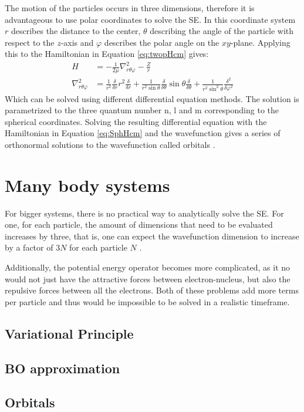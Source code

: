\documentclass[../master_thesis.tex]{subfiles}
\begin{document}
The motion of the particles occurs in three dimensions, therefore it is
advantageous to use polar coordinates to solve the \ac{SE}. In this coordinate
system $r$ describes the distance to the center, $\theta$ describing the angle
of the particle with respect to the $z$-axis and $\varphi$ describes the polar
angle on the $xy$-plane. Applying this to the Hamiltonian in Equation
\ref{eq:twopHcm} gives:
\begin{equation}
  \begin{align}
    H &= -\frac{1}{2\mu}\nabla^2_{r\theta\varphi} - \frac{Z}{r}\\
    \nabla^2_{r\theta\varphi} &=
    \frac{1}{r^2}\frac{\delta}{\delta r}r^2\frac{\delta}{\delta r}
    + \frac{1}{r^2 \sin{\theta}}\frac{\delta}{\delta\theta}\sin{\theta}
      \frac{\delta}{\delta\theta}
    + \frac{1}{r^2\sin^2{\theta}}\frac{\delta^2}{\delta\varphi^2}
    \label{eq:SphHcm}
  \end{align}
\end{equation}
Which can be solved using different differential equation methods. The solution
is parametrized to the three quantum number n, l and m corresponding to the
spherical coordinates. Solving the resulting differential equation with the
Hamiltonian in Equation \ref{eq:SphHcm} and the wavefunction gives a series of
orthonormal solutions to the wavefunction called orbitals \cite{Jensen:2017}.
\section{Many body systems}

For bigger systems, there is no practical way to analytically solve the
\ac{SE}. For one, for each particle, the amount of dimensions that need to be
evaluated increases by three, that is, one can expect the wavefunction
dimension to increase by a factor of $3N$ for each particle $N$
\cite{Cramer:2004}.

Additionally, the potential energy operator becomes more complicated,
as it no would not just have the attractive forces between electron-nucleus,
but also the repulsive forces between all the electrons. Both of these problems
add more terms per particle and thus would be impossible to be solved in a
realistic timeframe. %

\subsection{Variational Principle}

\subsection{\ac{BO} approximation}

\subsection{Orbitals}









\biblio
\end{document}

